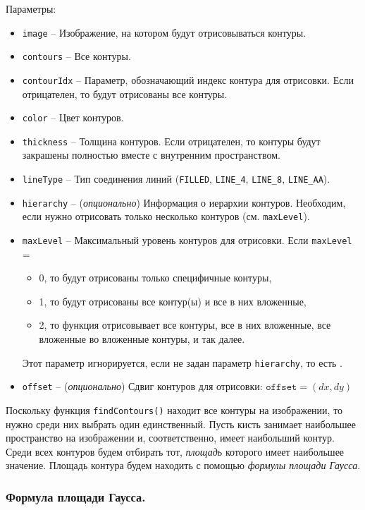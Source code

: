 Параметры:
\begin{itemize}
	\item {\tt image} -- Изображение, на котором будут отрисовываться
контуры.
	\item {\tt contours} -- Все контуры.
	\item {\tt contourIdx} -- Параметр, обозначающий индекс контура
для отрисовки. Если отрицателен, то будут отрисованы все контуры.
	\item {\tt color} -- Цвет контуров.
	\item {\tt thickness} -- Толщина контуров. Если отрицателен, то
контуры будут закрашены полностью вместе с внутренним пространством.
	\item {\tt lineType} -- Тип соединения линий ({\tt FILLED}, 
{\tt LINE\_4}, {\tt LINE\_8}, {\tt LINE\_AA}).
	\item {\tt hierarchy} -- ({\it опционально}) Информация о иерархии 
контуров. Необходим, если нужно отрисовать только несколько контуров 
(см. {\tt maxLevel}).
	\item {\tt maxLevel} -- Максимальный уровень контуров для
отрисовки. Если {\tt maxLevel} = 
	\begin{itemize} 
		\item 0, то будут отрисованы только специфичные 
контуры,
		\item 1, то будут отрисованы все контур(ы) и все в них
вложенные,
		\item 2, то функция отрисовывает все контуры, все в них 
вложенные, все вложенные во вложенные контуры, и так далее. 
	\end{itemize}
Этот параметр игнорируется, если не задан параметр {\tt hierarchy}, то
есть .
	\item {\tt offset} -- ({\it опционально}) Сдвиг контуров для отрисовки:
$\texttt{offset} = (dx, dy)$
\end{itemize}

\bigskip

Поскольку функция {\tt findContours()} находит все контуры на 
изображении, то нужно среди них выбрать один единственный. 
Пусть кисть занимает наибольшее пространство на изображении и, 
соответственно, имеет наибольший контур. Среди всех контуров будем 
отбирать тот, {\it площадь} которого имеет наибольшее значение. 
Площадь контура будем находить с помощью {\it формулы площади Гаусса}.

\subsubsection{Формула площади Гаусса.}

